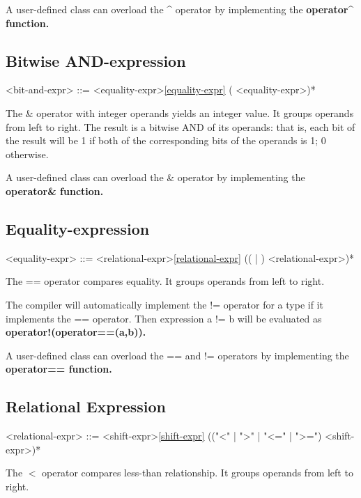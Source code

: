 \documentclass[a4paper,oneside,11pt]{article}
\begin{document}
A user-defined class can overload the \^{} operator by implementing the \bf{operator\^{}} function.

\subsection{Bitwise AND-expression}

\begin{grammar}
\label{bit-and-expr}<bit-and-expr> ::= <equality-expr>\ref{equality-expr} (\lit*{\&} <equality-expr>)*
\end{grammar}

The \& operator with integer operands yields an integer value. It groups operands from left to right.
The result is a bitwise AND of its operands:
that is, each bit of the result will be 1 if both of the corresponding bits of the operands is 1; 0 otherwise.

A user-defined class can overload the \& operator by implementing the \bf{operator\&} function.

\subsection{Equality-expression}

\begin{grammar}
\label{equality-expr}<equality-expr> ::= <relational-expr>\ref{relational-expr} ((\lit*{==} | \lit*{!=}) <relational-expr>)*
\end{grammar}

The == operator compares equality. It groups operands from left to right.

The compiler will automatically implement the != operator for a type if it implements the == operator.
Then expression a != b will be evaluated as \bf{operator!(operator==(a,b))}.

A user-defined class can overload the == and != operators by implementing the \bf{operator==} function.

\subsection{Relational Expression}

\begin{grammar}
\label{relational-expr}<relational-expr> ::= <shift-expr>\ref{shift-expr} (("<" | ">" | "<=" | ">=") <shift-expr>)*
\end{grammar}

The $<$ operator compares less-than relationship. It groups operands from left to right.
\end{document}
